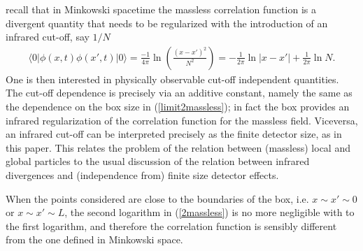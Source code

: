 \documentclass[10pt, nofootinbib]{revtex4}
\newcommand{\bea}{\begin{eqnarray}}
\newcommand{\eea}{\end{eqnarray}}
\begin{document}
recall that in Minkowski spacetime the massless correlation function
is a divergent quantity that needs to be regularized with the
introduction of an infrared cut-off, say $1/N$
%
\bea \langle 0 | \phi(x,t) \phi(x',t) | 0 \rangle = \frac{-1}{4 \pi}
\ln \left( \frac{(x-x')^2}{N^2} \right) 
=
-\frac{1}{2\pi} \ln|x-x'| + \frac{1}{2\pi} \ln N .
 \eea
%
One is then interested in physically observable cut-off independent
quantities.  The cut-off dependence is precisely via an additive
constant, namely the same as the dependence on the box size in
(\ref{limit2massless}); in fact the box provides an infrared
regularization of the correlation function for the massless field. 
Viceversa, an infrared cut-off can be interpreted precisely as the
finite detector size, as in this paper.  This relates the problem of
the relation between (massless) local and global particles to the
usual discussion of the relation between infrared divergences and
(independence from) finite size detector effects.

When the points considered are close to the boundaries of the box,
i.e. $x \sim x' \sim 0$ or $x \sim x' \sim L$, the second logarithm in
(\ref{2massless}) is no more negligible with to the first logarithm,
and therefore the correlation function is sensibly different from the
one defined in Minkowski space.
\end{document}
